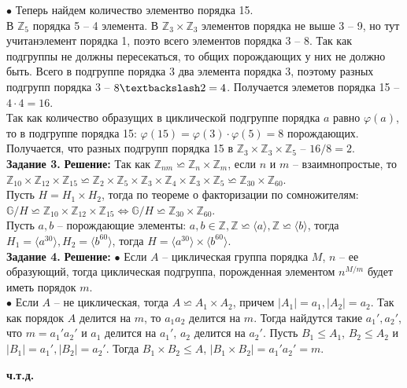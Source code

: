 \documentclass[12pt,a4paper]{scrartcl}
\begin{document}
	$\bullet$ Теперь найдем количество элементво порядка 15.\\
	В $\mathbb{Z}_5$ порядка 5 -- 4 элемента. В $\mathbb{Z}_3 \times \mathbb{Z}_3$ элементов порядка не выше 3 -- 9, но тут учитанэлемент порядка 1, поэто всего элементов порядка 3 -- 8. Так как подгруппы не должны пересекаться, то общих порождающих у них не должно быть. Всего в подгруппе порядка 3 два элемента порядка 3, поэтому разных подгрупп порядка 3 -- $8 \textbackslash 2 = 4$. Получается элеметов порядка 15 -- $4 \cdot 4 = 16$.\\
	Так как количество образущих в циклической подгруппе порядка $a$ равно $\varphi(a)$, то в подгруппе порядка 15: $\varphi(15) = \varphi(3) \cdot \varphi(5) = 8$ порождающих. Получается, что разных подгрупп порядка 15 в $\mathbb{Z}_3 \times \mathbb{Z}_3 \times \mathbb{Z}_5$ -- $16 / 8 = 2$.\\
	\newline
	\textbf{Задание 3.} 
	\newline
	\textbf{Решение:} 
	\newline
	\indent
	Так как $\mathbb{Z}_{nm} \backsimeq \mathbb{Z}_{n} \times \mathbb{Z}_{m}$, если $n$ и $m$ -- взаимнопростые, то \\
	 $\mathbb{Z}_{10} \times \mathbb{Z}_{12} \times \mathbb{Z}_{15} \backsimeq
	\mathbb{Z}_2 \times \mathbb{Z}_5 \times \mathbb{Z}_3 \times \mathbb{Z}_4 \times \mathbb{Z}_3 \times \mathbb{Z}_5 \backsimeq \mathbb{Z}_{30} \times \mathbb{Z}_{60}$.\\
	Пусть $H = H_1 \times H_2$, тогда по теореме о факторизации по сомножителям:\\
	$\mathbb{G} / H \backsimeq \mathbb{Z}_{10} \times \mathbb{Z}_{12} \times \mathbb{Z}_{15} \Leftrightarrow \mathbb{G} / H \backsimeq \mathbb{Z}_{30} \times \mathbb{Z}_{60}$.\\
	Пусть $a, b$ -- порождающие элементы: $a, b \in \mathbb{Z}, \mathbb{Z} \backsimeq \langle a \rangle, \mathbb{Z} \backsimeq \langle b \rangle$, тогда $H_1 = \langle a^{30} \rangle, H_2 = \langle b^{60} \rangle$, тогда 
	$H = \langle a^{30} \rangle \times \langle b^{60} \rangle$. \\
	
	\noindent
	\textbf{Задание 4.} 
	\newline
	\textbf{Решение:} 
	\newline
	\indent
	$\bullet$ Если $A$ -- циклическая группа порядка $M$, $n$ -- ее образующий, тогда циклическая подгруппа, порожденная элементом $n^{M/m}$ будет иметь порядок $m$.\\
	\indent
	$\bullet$ Если $A$ -- не циклическая, тогда $A \backsimeq A_1 \times A_2$, причем $|A_1| = a_1, |A_2| = a_2$. Так как порядок $A$ делится на $m$, то $a_1a_2$ делится на $m$. Тогда найдутся такие $a_1', a_2'$, что  $m = a_1'a_2'$ и $a_1$ делится на $a_1'$, $a_2$ делится на $a_2'$. Пусть $B_1\leq A_1$, $B_2 \leq A_2$ и $|B_1| = a_1', |B_2| = a_2'$. Тогда $B_1 \times B_2 \leq A$, $|B_1 \times B_2| = a_1'a_2' = m$.
	\begin{flushright}	
	\textbf{ч.т.д.}
	\end{flushright}	
\end{document}
